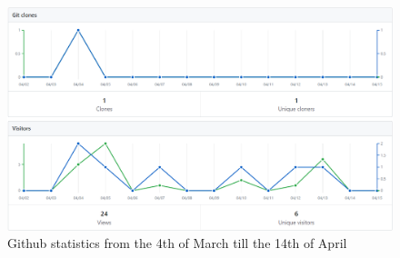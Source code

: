 \documentclass{subfiles}
\begin{document}
 	\begin{figure} [h!]
 		\centering
 		\includegraphics[width=\textwidth]{img/githupStatistics}
 		\caption{Github statistics from the 4th of March till the 14th of April}
 		\label{fig:githupStatistics}
 	\end{figure}
 	
\end{document}
